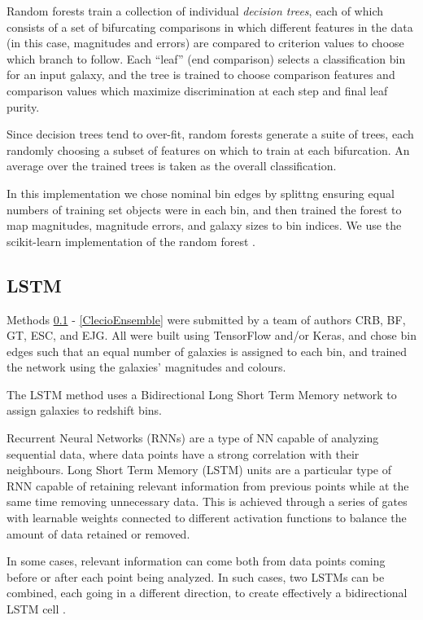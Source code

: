\documentclass[twocolumn,twocolappendix]{aastex63}
\begin{document}
Random forests \citep{breiman2001} train a collection of individual \emph{decision trees},
each of which consists of a set of bifurcating comparisons in which different features in
the data (in this case, magnitudes and errors) are compared to criterion values to choose
which branch to follow.  Each ``leaf'' (end comparison) selects a classification bin for
an input galaxy, and the tree is trained to choose comparison features and comparison values
which maximize discrimination at each step and final leaf purity.

Since decision trees tend to over-fit, random forests generate a suite of 
trees, each randomly choosing a subset of features on which to train at each bifurcation.
An average over the trained trees is taken as the overall classification.

In this implementation we chose nominal bin edges by splittng ensuring equal numbers of training set 
objects were in each bin, and then trained the forest to map magnitudes, magnitude errors, and
galaxy sizes to bin indices.  We use the {\sc scikit-learn} implementation of the random forest
\citep{scikit-learn}.


\subsection{ {\sc LSTM} } 
\label{ClecioLSTM} 
Methods \ref{ClecioLSTM} - \ref{ClecioEnsemble} were
submitted by a team of authors CRB, BF, GT, ESC, and EJG.  All were built using TensorFlow and/or Keras, and
chose bin edges such that an equal number of galaxies is assigned to each bin, and trained the
network using the galaxies' magnitudes and colours. 

The LSTM method uses a Bidirectional Long Short Term Memory network to assign galaxies to redshift
bins.
 
Recurrent Neural Networks (RNNs) \citep{schuster, medsker, pascanu} are a type of NN capable of
analyzing sequential data, where data points have a strong correlation with their neighbours. Long
Short Term Memory (LSTM) units are a particular type of RNN capable of retaining relevant
information from previous points while at the same time removing unnecessary data. This is achieved
through a series of gates with learnable weights connected to different activation functions to
balance the amount of data retained or removed.
 
In some cases, relevant information can come both from data points coming before or after each point
being analyzed. In such cases, two LSTMs can be combined, each going in a different direction, to
create effectively a bidirectional LSTM cell \citep{schuster}.
 
\end{document}
